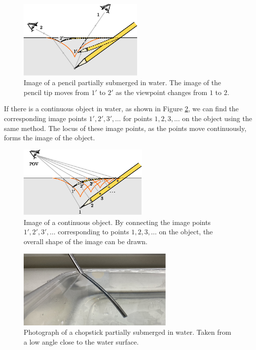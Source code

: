 \documentclass[twocolumn]{article}
\begin{document}
\begin{figure}[h]
	\centering
	\includegraphics[width=2.4in]{figs/g43.eps}
	\caption{Image of a pencil partially submerged in water. The image of the pencil tip moves from $1'$ to $2'$ as the viewpoint changes from $1$ to $2$.}
	\label{fig:pencil_view}
\end{figure}

If there is a continuous object in water, as shown in Figure \ref{fig:extended_image}, we can find the corresponding image points $1', 2', 3', \dots$ for points $1, 2, 3, ...$ on the object using the same method. The locus of these image points, as the points move continuously, forms the image of the object.

\begin{figure}[h]
	\centering
	\includegraphics*[width=2.5in]{figs/g242.eps}
	\caption{Image of a continuous object. By connecting the image points $1', 2', 3', \dots$ corresponding to points $1, 2, 3, \dots$ on the object, the overall shape of the image can be drawn.}
	\label{fig:extended_image}
\end{figure}

\begin{figure}[!h]
	\centering
	\includegraphics[width=3in]{figs/img_1805_2.eps}
	\caption{Photograph of a chopstick partially submerged in water. Taken from a low angle close to the water surface.}
	\label{fig:picture}
\end{figure}
\end{document}
